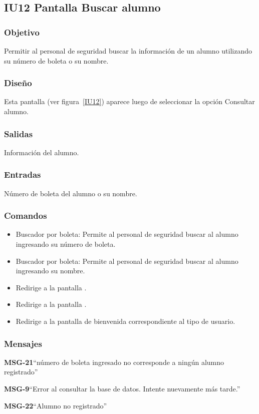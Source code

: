 \subsection{IU12 Pantalla Buscar alumno}

\subsubsection{Objetivo}
    Permitir al personal de seguridad buscar la información de un alumno utilizando su número de boleta o su nombre. 

\subsubsection{Diseño}
    Esta pantalla  (ver figura~\ref{IU12}) aparece luego de seleccionar la opción Consultar alumno. 


\subsubsection{Salidas}
    Información del alumno.

\subsubsection{Entradas}
    Número de boleta del alumno o su nombre. 

\subsubsection{Comandos}
\begin{itemize}
    \item Buscador por boleta: Permite al personal de seguridad buscar al alumno ingresando su número de boleta.
    \item Buscador por boleta: Permite al personal de seguridad buscar al alumno ingresando su nombre.
    \item {} Redirige a la pantalla .
    \item {} Redirige a la pantalla .
    \item {} Redirige a la pantalla de bienvenida correspondiente al tipo de usuario.
\end{itemize}

\subsubsection{Mensajes}

\begin{Citemize}
    \item {\bf MSG-21}{``número de boleta ingresado no corresponde a ningún alumno registrado''}
    \item {\bf MSG-9}{``Error al consultar la base de datos. Intente nuevamente más tarde.''}
    \item {\bf MSG-22}{``Alumno no registrado''}
\end{Citemize}


